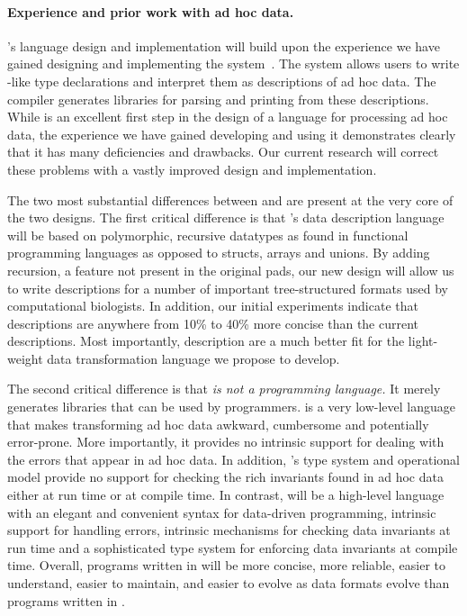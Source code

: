 \documentclass[11pt]{article}
\begin{document}
\paragraph*{Experience and prior work with ad hoc data.}
\datatype's language design and implementation will build upon the experience
we have gained designing and implementing the \pads{}
system~\cite{fisher+:pads,pads-website}.  The \pads{} system allows
users to write \C-like type declarations and interpret them as
descriptions of ad hoc data.  The \pads{} compiler generates libraries
for parsing and printing from these descriptions.  
While \pads{} is an excellent first step in the design of
a language for processing ad hoc data, the experience we have
gained developing and using it demonstrates clearly that 
it has many deficiencies and drawbacks.  Our current research 
will correct these problems with a vastly improved
design and implementation.

The two most substantial differences between \pads{} and 
\datatype{} are present at the very core of the two designs.
The first critical difference is that 
\datatype's data description language will be based on
polymorphic, recursive datatypes as found in functional programming languages
as opposed to \C{} structs, arrays
and unions.  By adding recursion, a feature not present in the original
pads, our new design will allow us to write descriptions for a
number of important tree-structured formats used by computational 
biologists.  In addition, our initial
experiments indicate that \datatype{} descriptions are anywhere from
10\% to 40\% more concise than the current \pads{} descriptions.  Most
importantly, \datatype{} description are a much better fit for the
light-weight data transformation language we propose to develop.  

The second critical difference is that {\em \pads{} is not a programming
language.}  It merely generates libraries that can be used by \C{}
programmers.  \C{} is a very low-level language that makes
transforming ad hoc data awkward, cumbersome and potentially
error-prone.  More importantly, it provides no intrinsic support for
dealing with the errors that appear in ad hoc data.  In addition, \C's
type system and operational model provide no support for checking the
rich invariants found in ad hoc data either at run time or at compile
time.  In contrast, \datatype{} will be a high-level language with an
elegant and convenient syntax for data-driven programming, intrinsic
support for handling errors, intrinsic mechanisms for checking data
invariants at run time and a sophisticated type system for enforcing
data invariants at compile time.  Overall,
programs written in \datatype{} will be more concise, more reliable,
easier to understand,
easier to maintain, and easier to evolve as data formats evolve
than programs written in \C.
\end{document}
